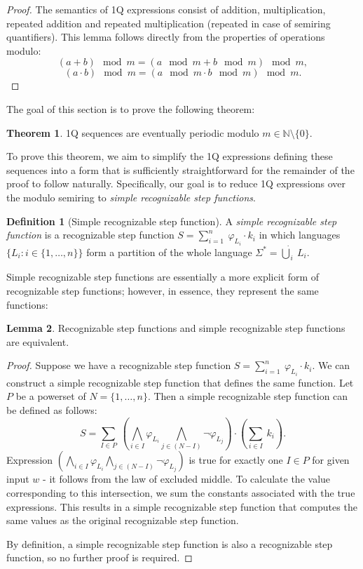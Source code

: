 \documentclass[12pt]{article}
\theoremstyle{definition}
\newtheorem{definition}{Definition}[section]
\newtheorem{theorem}{Theorem}[section]
\newtheorem{lemma}[theorem]{Lemma}
\begin{document}
\begin{proof}
    The semantics of 1Q expressions consist of addition, multiplication, repeated addition and repeated multiplication (repeated in case of semiring quantifiers). This lemma follows directly from the properties of operations modulo:
    $$(a + b) \mod m = (a \mod m + b \mod m) \mod m,$$
    $$(a \cdot b) \mod m = (a \mod m \cdot b \mod m) \mod m.$$
\end{proof}

The goal of this section is to prove the following theorem:

\begin{theorem}
    \label{1QSequencesPeriodic}
    1Q sequences are eventually periodic modulo $m \in \mathbb{N} \setminus \{0\}$.
\end{theorem}

To prove this theorem, we aim to simplify the 1Q expressions defining these sequences into a form that is sufficiently straightforward for the remainder of the proof to follow naturally. Specifically, our goal is to reduce 1Q expressions over the modulo semiring to \emph{simple recognizable step functions}.

\begin{definition}[Simple recognizable step function]
    \label{DefSimpleRecStepFun}
    A \textit{simple recognizable step function} is a recognizable step function $S = \sum_{i = 1}^{n} \ \varphi_{L_i} \cdot k_i$ in which languages $\{L_i : i \in \{1,\ldots,n\}\}$ form a partition of the whole language $\Sigma^* = \dot{\bigcup}_i \ L_i$.
\end{definition}

Simple recognizable step functions are essentially a more explicit form of recognizable step functions; however, in essence, they represent the same functions:

\begin{lemma}
    \label{RecEqSimpleRec}
    Recognizable step functions and simple recognizable step functions are equivalent.
\end{lemma}

\begin{proof}
    Suppose we have a recognizable step function $S = \sum_{i = 1}^{n} \ \varphi_{L_i} \cdot k_i$. We can construct a simple recognizable step function that defines the same function. Let $P$ be a powerset of $N = \{1,\ldots,n\}$. Then a simple recognizable step function can be defined as follows:
    $$S = \sum_{I \in P} \ (\bigwedge_{i \in I} \varphi_{L_i} \bigwedge_{j \in (N-I)} \neg \varphi_{L_j}) \cdot (\sum_{i \in I} \ k_i).$$
    Expression $(\bigwedge_{i \in I} \varphi_{L_i} \bigwedge_{j \in (N-I)} \neg \varphi_{L_j})$ is true for exactly one $I \in P$ for given input $w$ - it follows from the law of excluded middle. To calculate the value corresponding to this intersection, we sum the constants associated with the true expressions. This results in a simple recognizable step function that computes the same values as the original recognizable step function.

    By definition, a simple recognizable step function is also a recognizable step function, so no further proof is required.
\end{proof}
\end{document}
